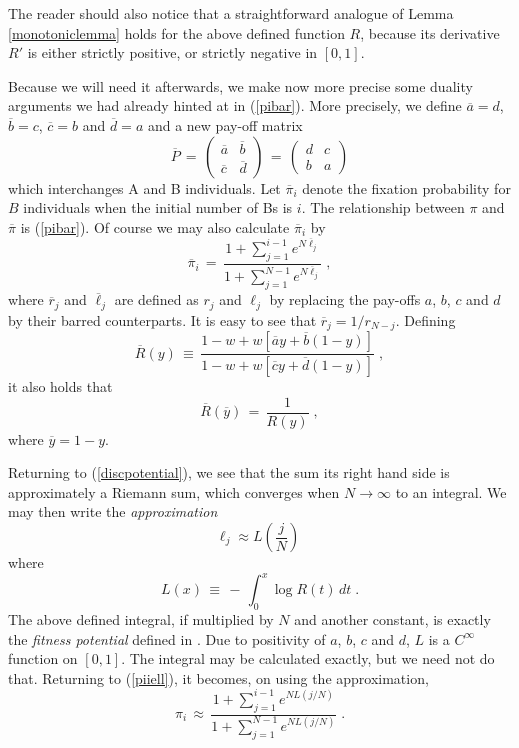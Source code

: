 \documentclass[12pt]{article}
\begin{document}
The reader should also notice that a straightforward analogue of Lemma \ref{monotoniclemma} holds for the above defined function $R$, because its derivative $R'$ is either strictly positive, or strictly negative in $[0,1]$.

Because we will need it afterwards, we make now more precise some duality arguments we had already hinted at in (\ref{pibar}). More precisely, we define $\overline{a}=d$, $\overline{b}=c$, $\overline{c}=b$ and $\overline{d}=a$ and a new pay-off matrix
\begin{equation}  \label{barpayoff}
\overline P \,=\,\left(\begin{array}{cc}
\overline a& \overline b\\
\overline c&\overline d
\end{array}
\right) \,=\, \left(\begin{array}{cc}
d & c\\
b &a
\end{array}
\right) 
\end{equation}
which interchanges A and B individuals. Let $\overline{\pi}_i$ denote the fixation probability for $B$ individuals when the initial number of Bs is $i$. The relationship between $\pi$ and $\overline \pi$ is (\ref{pibar}). Of course we may also calculate $\overline \pi_i$ by
\begin{equation}
\label{pibarell}
\overline \pi_i \,=\, \frac{1+ \sum_{j=1}^{i-1} e^{ N \overline \ell_j}}{1+ \sum_{j=1}^{N-1} e^{ N \overline \ell_j}} \;,
\end{equation}
where $\overline r_j$ and $\overline \ell_j$ are defined as $r_j$ and $\ell_j$ by replacing the pay-offs $a$, $b$, $c$ and $d$ by their barred counterparts. It is easy to see that $\overline r_j= 1/r_{N-j}$. Defining
\begin{equation}
\label{defRbar}
\overline R(y) \,\equiv \, \frac{1-w+w[\overline ay+\overline b(1-y)]}{1-w+w[\overline cy+\overline d(1-y)]}\;,
\end{equation}
it also holds that
\begin{equation}  \label{dualR}
\overline R(\overline y) \,=\, \frac{1}{R(y)}\;,
\end{equation}
where $\overline y=1-y$.

Returning to  (\ref{discpotential}), we see that the sum its right hand side is approximately a Riemann sum, which converges when $N \rightarrow \infty $ to an integral. We may then write the \textit{approximation}
\[\ell_j \approx L(\frac{j}{N}) \;\]
where 
\begin{equation}
\label{defL}
L(x) \,\equiv  \, - \, \int_{0}^{x} \log R(t) \,dt \;.
\end{equation}
The above defined integral, if multiplied by $N$ and another constant, is exactly the \textit{fitness potential} defined in \cite{ChalubSouza2016}. Due to positivity of $a$, $b$, $c$ and $d$, $L$ is a $C^{\infty}$ function on $[0,1]$. The integral may be calculated exactly, but we need not do that. Returning to (\ref{piiell}), it becomes, on using the approximation,
\begin{equation}  \label{approxpii}
\pi_i \, \approx \, \frac{1+ \sum_{j=1}^{i-1} e^{N L(j/N)}}{1+ \sum_{j=1}^{N-1} e^{N L(j/N)}} \;.
\end{equation}
\end{document}
